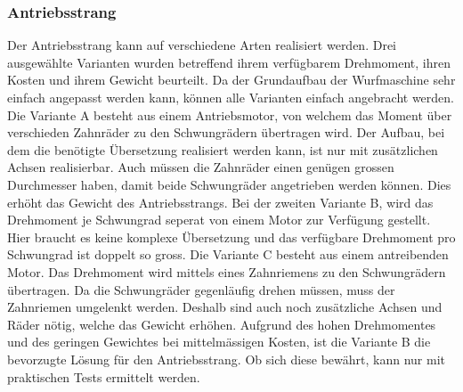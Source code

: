 \subsubsection{Antriebsstrang}
Der Antriebsstrang kann auf verschiedene Arten realisiert werden. Drei ausgewählte Varianten wurden
betreffend ihrem verfügbarem Drehmoment, ihren Kosten und ihrem Gewicht beurteilt. Da der Grundaufbau
der Wurfmaschine sehr einfach angepasst werden kann, können alle Varianten einfach angebracht werden.
Die Variante A besteht aus einem Antriebsmotor, von welchem das Moment über verschieden Zahnräder zu den
Schwungrädern übertragen wird. Der Aufbau, bei dem die benötigte Übersetzung realisiert werden kann, ist
nur mit zusätzlichen Achsen realisierbar. Auch müssen die Zahnräder einen genügen grossen Durchmesser
haben, damit beide Schwungräder angetrieben werden können. Dies erhöht das Gewicht des Antriebsstrangs. Bei der
zweiten Variante B, wird das Drehmoment je Schwungrad seperat von einem Motor zur Verfügung gestellt.
Hier braucht es keine komplexe Übersetzung und das verfügbare Drehmoment pro Schwungrad ist doppelt
so gross. Die Variante C besteht aus einem antreibenden Motor. Das Drehmoment wird mittels eines
Zahnriemens zu den Schwungrädern übertragen. Da die Schwungräder gegenläufig drehen müssen, muss der
Zahnriemen umgelenkt werden. Deshalb sind auch noch zusätzliche Achsen und Räder nötig, welche das
Gewicht erhöhen. Aufgrund des hohen Drehmomentes und des geringen Gewichtes bei mittelmässigen Kosten,
ist die Variante B die bevorzugte Lösung für den Antriebsstrang. Ob sich diese bewährt, kann nur mit
praktischen Tests ermittelt werden. 
